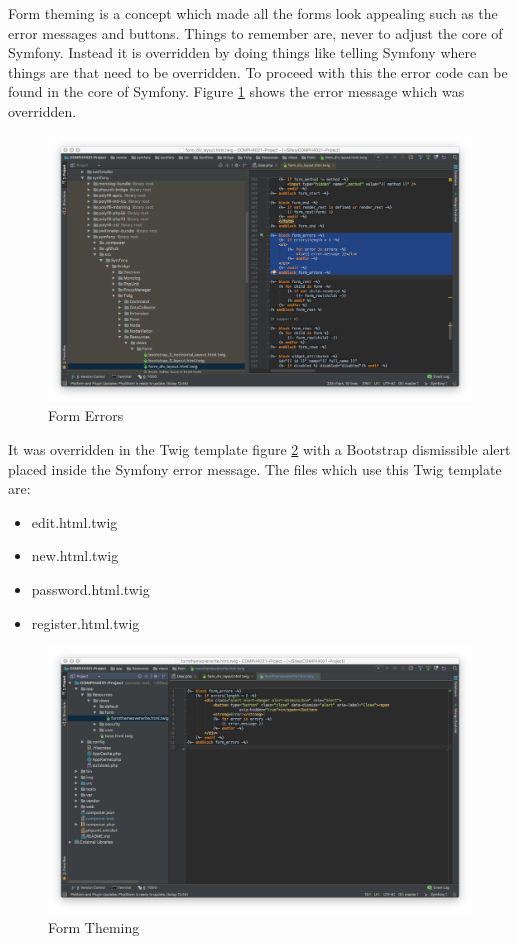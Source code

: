 Form theming is a concept which made all the forms look appealing such as the error messages and buttons. Things to remember are, never to adjust the core of Symfony. Instead it is overridden by doing things like telling Symfony where things are that need to be overridden. To proceed with this the error code can be found in the core of Symfony. Figure \ref{fig:Form Errors} shows the error message which was overridden.

\begin{figure}[htbp]
   \centering
   \includegraphics[width=400pt]{figures/form_errors.png} %
   \caption{Form Errors}
   \label{fig:Form Errors}
\end{figure}

It was overridden in the Twig template figure \ref{fig:Form Theming} with a Bootstrap dismissible alert placed inside the Symfony error message. The files which use this Twig template are:

\begin{itemize}
  \item edit.html.twig
    \item new.html.twig
      \item password.html.twig
        \item register.html.twig
\end{itemize}

\begin{figure}[htbp]
   \centering
   \includegraphics[width=400pt]{figures/formthemeoverwrite.png} %
   \caption{Form Theming}
   \label{fig:Form Theming}
\end{figure}

